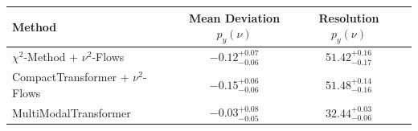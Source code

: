    \begin{tabular}{lccc}
        \toprule
        Method & Mean Deviation $p_{y}(\nu)$ & Resolution $p_{y}(\nu)$ \\
        \midrule
        $\chi^2$-Method + $\nu^2$-Flows & $-0.12^{+0.07}_{-0.06}$ & $51.42^{+0.16}_{-0.17}$ \\
        CompactTransformer + $\nu^2$-Flows & $-0.15^{+0.06}_{-0.06}$ & $51.48^{+0.14}_{-0.16}$ \\
        MultiModalTransformer & $-0.03^{+0.08}_{-0.05}$ & $32.44^{+0.03}_{-0.06}$ \\
        \bottomrule
    \end{tabular}
